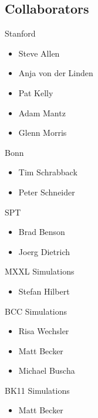 \documentclass[11pt]{article}
\begin{document}
\subsection{Collaborators}

Stanford
\begin{itemize}
\item Steve Allen
\item Anja von der Linden
\item Pat Kelly
\item Adam Mantz
\item Glenn Morris
\end{itemize}

Bonn
\begin{itemize}
\item Tim Schrabback
\item Peter Schneider
\end{itemize}

SPT
\begin{itemize}
\item Brad Benson
\item Joerg Dietrich
\end{itemize}

MXXL Simulations
\begin{itemize}
\item Stefan Hilbert
\end{itemize}

BCC Simulations
\begin{itemize}
\item Risa Wechsler
\item Matt Becker
\item Michael Buscha
\end{itemize}

BK11 Simulations
\begin{itemize}
\item Matt Becker
\end{itemize}





\end{document}

